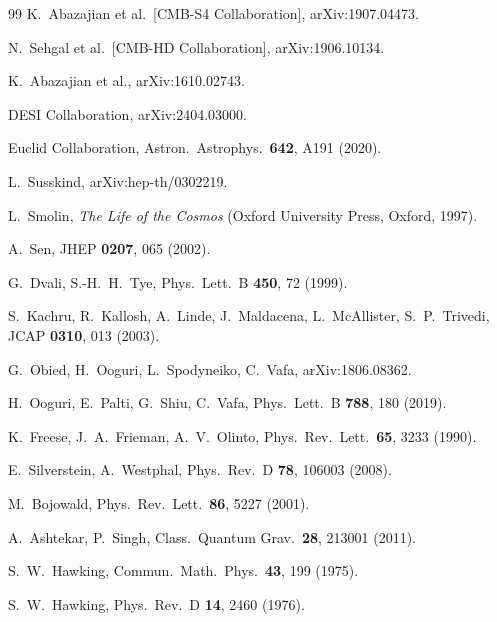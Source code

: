 \documentclass[epj]{svjour}
\begin{document}
\begin{thebibliography}{99}
K.~Abazajian et al.\ [CMB-S4 Collaboration],
arXiv:1907.04473.

N.~Sehgal et al.\ [CMB-HD Collaboration],
arXiv:1906.10134.

K.~Abazajian et al.,
arXiv:1610.02743.

DESI Collaboration,
arXiv:2404.03000.

Euclid Collaboration,
Astron.\ Astrophys.\ \textbf{642}, A191 (2020).

L.~Susskind,
arXiv:hep-th/0302219.

L.~Smolin,
\textit{The Life of the Cosmos}
(Oxford University Press, Oxford, 1997).

A.~Sen,
JHEP \textbf{0207}, 065 (2002).

G.~Dvali, S.-H.~H.~Tye,
Phys.\ Lett.\ B \textbf{450}, 72 (1999).

S.~Kachru, R.~Kallosh, A.~Linde, J.~Maldacena, L.~McAllister,
S.~P.~Trivedi,
JCAP \textbf{0310}, 013 (2003).

G.~Obied, H.~Ooguri, L.~Spodyneiko, C.~Vafa,
arXiv:1806.08362.

H.~Ooguri, E.~Palti, G.~Shiu, C.~Vafa,
Phys.\ Lett.\ B \textbf{788}, 180 (2019).

K.~Freese, J.~A.~Frieman, A.~V.~Olinto,
Phys.\ Rev.\ Lett.\ \textbf{65}, 3233 (1990).

E.~Silverstein, A.~Westphal,
Phys.\ Rev.\ D \textbf{78}, 106003 (2008).


M.~Bojowald,
Phys.\ Rev.\ Lett.\ \textbf{86}, 5227 (2001).

A.~Ashtekar, P.~Singh,
Class.\ Quantum Grav.\ \textbf{28}, 213001 (2011).


S.~W.~Hawking,
Commun.\ Math.\ Phys.\ \textbf{43}, 199 (1975).

S.~W.~Hawking,
Phys.\ Rev.\ D \textbf{14}, 2460 (1976).



\end{thebibliography}
\end{document}
